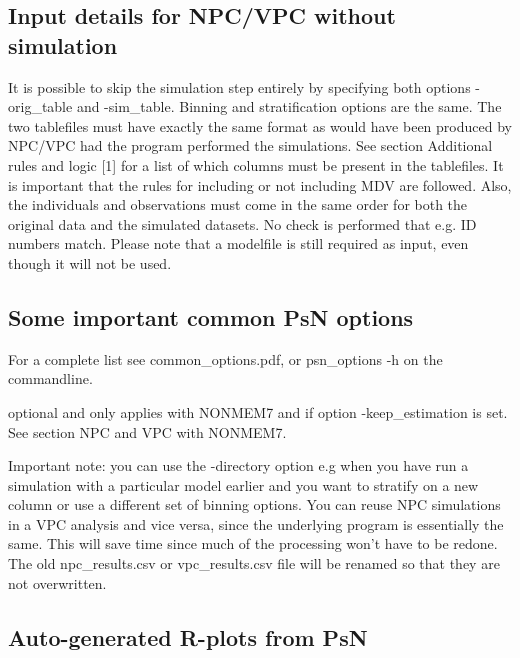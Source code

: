 \subsection{Input details for NPC/VPC without simulation}
It is possible to skip the simulation step entirely by specifying both options -orig\_table and -sim\_table.  Binning and stratification options are the same. The two tablefiles must have exactly the same format as would have been produced by NPC/VPC had the program performed the simulations. See section Additional rules and logic [1] for a list of which columns must be present in the tablefiles. It is important that the rules for including or not including MDV are followed. Also, the individuals and observations must come in the same order for both the original data and the simulated datasets. No check is performed that e.g. ID numbers match. Please note that a modelfile is still required as input, even though it will not be used.

\subsection{Some important common PsN options}
For a complete list see common\_options.pdf, 
or psn\_options -h on the commandline.

\begin{optionlist}
optional and only applies with NONMEM7 and if option -keep\_estimation is set. See section NPC and VPC with NONMEM7. 
\nextopt
\end{optionlist}

Important note: you can use the -directory option e.g when you have run a 
simulation with a particular model earlier and you want to stratify on a new 
column or use a different set of binning options. You can reuse 
NPC simulations in a VPC analysis and vice versa, since the underlying program 
is essentially the same. 
This will save time since much of the processing won't have to be redone. 
The old npc\_results.csv or vpc\_results.csv file will be renamed so that 
they are not overwritten.

\subsection{Auto-generated R-plots from PsN}
\newcommand{\rplotsconditions}{The default vpc template 
requires the xpose4 R library to be installed.
If the conditions are not fulfilled then no pdf will be generated,
see the .Rout file in the main run directory for error messages.}


